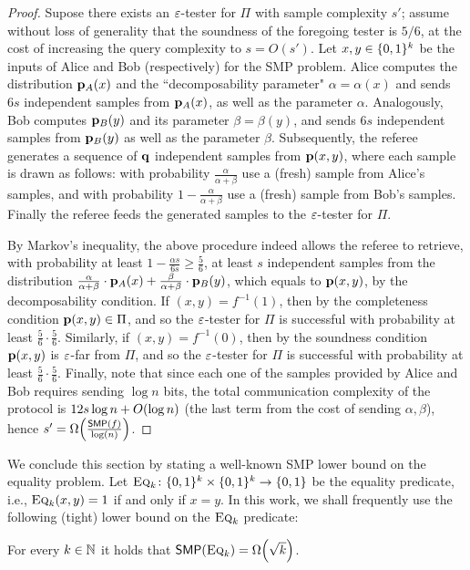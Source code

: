 \begin{proof}
Supose there exists an $\eps$-tester for $\Pi$ with sample complexity $s'$; assume without loss of generality that the soundness of the foregoing tester is $5/6$, at the cost of increasing the query complexity to $s=O(s')$. Let $x,y\in\bitset^k$ be the inputs of Alice and Bob (respectively) for the SMP problem. Alice computes the distribution $\p_A(x)$ and the ``decomposability parameter" $\alpha=\alpha(x)$ and sends $6 s$  independent samples from $\p_A(x)$, as well as the parameter $\alpha$. Analogously, Bob computes $\p_B(y)$ and its parameter $\beta=\beta(y)$, and sends $6s$ independent samples from $\p_B(y)$ as well as the parameter $\beta$. Subsequently, the referee generates a sequence of $\q$ independent samples from $\p(x,y)$, where each sample is drawn as follows: with probability $\frac{\alpha}{\alpha+\beta}$ use a (fresh) sample from Alice's samples, and with probability $1-\frac{\alpha}{\alpha+\beta}$ use a (fresh) sample from Bob's samples. Finally the referee feeds the generated samples to the $\eps$-tester for $\Pi$.

By Markov's inequality, the above procedure indeed allows the referee to retrieve, with probability at least $1-\frac{\alpha s}{6 s}\geq\frac{5}{6}$, at least $s$ independent samples from the distribution $\frac{\alpha}{\alpha+\beta}\cdot \p_A(x) + \frac{\beta}{\alpha+\beta}\cdot \p_B(y)$, which equals to $\p(x,y)$, by the decomposability condition. If $(x,y) = f^{-1}(1)$, then by the completeness condition $\p(x,y) \in \Pi$, and so the $\eps$-tester for $\Pi$ is successful with probability at least $\frac56 \cdot \frac 56$. Similarly, if $(x,y) = f^{-1}(0)$, then by the soundness condition $\p(x,y)$ is $\eps$-far from $\Pi$, and so the $\eps$-tester for $\Pi$ is successful with probability at least $\frac56 \cdot \frac 56$. Finally, note that since each one of the samples provided by Alice and Bob requires sending $\log n$ bits, the total communication complexity of the protocol is $12s\log n + \bigO{\log n}$ (the last term from the cost of sending $\alpha,\beta$), hence $s' = \bigOmega{\frac{\SMP(f)}{\log(n)}}$.
\end{proof}

We conclude this section by stating a well-known SMP lower bound on the equality problem. Let $\EQ[k]\colon \bitset^k \times \bitset^k \to \bitset$ be the equality predicate, i.e., $\EQ[k](x,y)=1$ if and only if $x=y$. In this work, we shall frequently use the following (tight) lower bound on the $\EQ[k]$ predicate:
\begin{theorem}\label{theo:equality:smp:lb}
For every $k\in\N$ it holds that $\SMP(\EQ[k]) =\bigOmega{\sqrt{k}}$.
\end{theorem}
 
